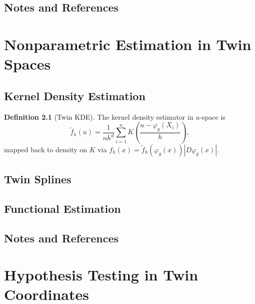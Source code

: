 \documentclass[11pt,twoside]{book}
\theoremstyle{plain}
\theoremstyle{definition}
\newtheorem{definition}[theorem]{Definition}
\theoremstyle{remark}
\begin{document}
\section{Notes and References}
\label{sec:ch11_notes}


\chapter{Nonparametric Estimation in Twin Spaces}
\label{ch:nonparametric}

\section{Kernel Density Estimation}
\label{sec:kde}

\begin{definition}[Twin KDE]
    The kernel density estimator in $u$-space is
    \[
    \tilde{f}_h(u) = \frac{1}{nh^d} \sum_{i=1}^n K\left(\frac{u - \varphi_g(X_i)}{h}\right),
    \]
    mapped back to density on $K$ via $f_h(x) = \tilde{f}_h(\varphi_g(x)) |D\varphi_g(x)|$.
\end{definition}

\section{Twin Splines}
\label{sec:splines}

\section{Functional Estimation}
\label{sec:functional}

\section{Notes and References}
\label{sec:ch12_notes}


\chapter{Hypothesis Testing in Twin Coordinates}
\label{ch:testing}
\end{document}
